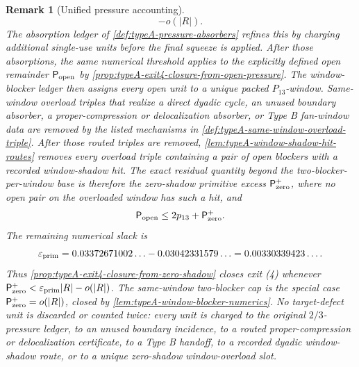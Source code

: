 \documentclass[11pt]{article}
\newtheorem{remark}[theorem]{Remark}
\begin{document}
\begin{remark}[Unified pressure accounting]
\[-o(|R|).
\]
The absorption ledger of \cref{def:typeA-pressure-absorbers} refines this by
charging additional single-use units before the final squeeze is applied.
After those absorptions, the same numerical threshold applies to the explicitly
defined open remainder \(\mathsf P_{\rm open}\) by
\cref{prop:typeA-exit4-closure-from-open-pressure}.  The window-blocker ledger
then assigns every open unit to a unique packed \(P_{13}\)-window.  Same-window
overload triples that realize a direct dyadic cycle, an unused boundary
absorber, a proper-compression or delocalization absorber, or Type B
fan-window data are removed by the listed mechanisms in
\cref{def:typeA-same-window-overload-triple}.  After those routed triples are
removed, \cref{lem:typeA-window-shadow-hit-routes} removes every overload
triple containing a pair of open blockers with a recorded window-shadow hit.
The exact residual quantity beyond the two-blocker-per-window base is therefore
the zero-shadow primitive excess \(\mathsf P_{\rm zero}^{+}\), where no open
pair on the overloaded window has such a hit, and
\[
\mathsf P_{\rm open}\le2p_{13}+\mathsf P_{\rm zero}^{+}.
\]
The remaining numerical slack is
\[
\varepsilon_{\rm prim}
=
0.03372671002\ldots-0.03042331579\ldots
=0.00330339423\ldots .
\]
Thus \cref{prop:typeA-exit4-closure-from-zero-shadow} closes exit
\textup{(4)} whenever
\(\mathsf P_{\rm zero}^{+}<\varepsilon_{\rm prim}|R|-o(|R|)\).  The
same-window two-blocker cap is the special case
\(\mathsf P_{\rm zero}^{+}=o(|R|)\), closed by
\cref{lem:typeA-window-blocker-numerics}.  No target-defect unit is discarded
or counted twice: every unit is charged to the original \(2/3\)-pressure
ledger, to an unused boundary incidence, to a routed proper-compression or
delocalization certificate, to a Type B handoff, to a recorded dyadic
window-shadow route, or to a unique zero-shadow window-overload slot.
\end{remark}
\end{document}
